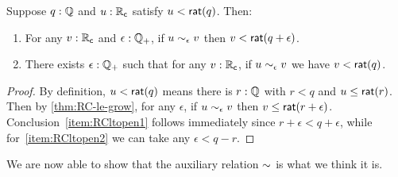 \begin{lem}\label{thm:RC-lt-open}
  Suppose $q:\mathbb{Q}$ and $u:\mathbb{R}_\mathsf{c}$ satisfy $u<\mathsf{rat}(q)$.  Then:
  \begin{enumerate}
  \item For any $v:\mathbb{R}_\mathsf{c}$ and $\epsilon:\mathbb{Q}_{+}$, if $u\sim_{\epsilon} v$ then $v< \mathsf{rat}(q+\epsilon)$.\label{item:RCltopen1}
  \item There exists $\epsilon:\mathbb{Q}_{+}$ such that for any $v:\mathbb{R}_\mathsf{c}$, if $u\sim_{\epsilon} v$ we have $v<\mathsf{rat}(q)$.\label{item:RCltopen2}
  \end{enumerate}
\end{lem}
\begin{proof}
  By definition, $u<\mathsf{rat}(q)$ means there is $r:\mathbb{Q}$ with $r<q$ and $u\le \mathsf{rat}(r)$.
  Then by \cref{thm:RC-le-grow}, for any $\epsilon$, if $u\sim_{\epsilon} v$ then $v\le \mathsf{rat}(r+\epsilon)$.
  Conclusion~\ref{item:RCltopen1} follows immediately since $r+\epsilon<q+\epsilon$, while for~\ref{item:RCltopen2} we can take any $\epsilon <q-r$.
\end{proof}

We are now able to show that the auxiliary relation $\mathord\sim$ is what we think it is.

